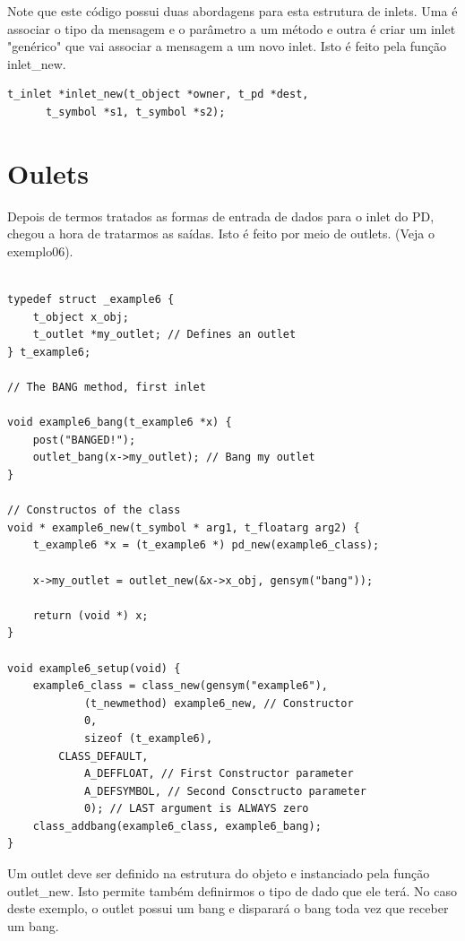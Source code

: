 \documentclass[10pt,a4paper]{report}
\begin{document}
Note que este código possui duas abordagens para esta estrutura de inlets. Uma é associar o tipo da mensagem e o parâmetro a um método e outra é criar um inlet "genérico" que vai associar a mensagem a um novo inlet. Isto é feito pela função inlet\_new.

\begin{lstlisting}
t_inlet *inlet_new(t_object *owner, t_pd *dest,
      t_symbol *s1, t_symbol *s2);
\end{lstlisting}

\section{Oulets}

Depois de termos tratados as formas de entrada de dados para o inlet do PD, chegou a hora de tratarmos as saídas. Isto é feito por meio de outlets. (Veja o exemplo06).

\begin{lstlisting}

typedef struct _example6 {
    t_object x_obj;
    t_outlet *my_outlet; // Defines an outlet
} t_example6;

// The BANG method, first inlet

void example6_bang(t_example6 *x) {
    post("BANGED!");
    outlet_bang(x->my_outlet); // Bang my outlet
}

// Constructos of the class
void * example6_new(t_symbol * arg1, t_floatarg arg2) {
    t_example6 *x = (t_example6 *) pd_new(example6_class);

    x->my_outlet = outlet_new(&x->x_obj, gensym("bang"));

    return (void *) x;
}

void example6_setup(void) {
    example6_class = class_new(gensym("example6"),
            (t_newmethod) example6_new, // Constructor
            0, 
            sizeof (t_example6),
	    CLASS_DEFAULT,
            A_DEFFLOAT, // First Constructor parameter
            A_DEFSYMBOL, // Second Consctructo parameter
            0); // LAST argument is ALWAYS zero
    class_addbang(example6_class, example6_bang);
}
\end{lstlisting}

Um outlet deve ser definido na estrutura do objeto e instanciado pela função outlet\_new. Isto permite também definirmos o tipo de dado que ele terá. No caso deste exemplo, o outlet possui um bang e disparará o bang toda vez que receber um bang.
\end{document}
